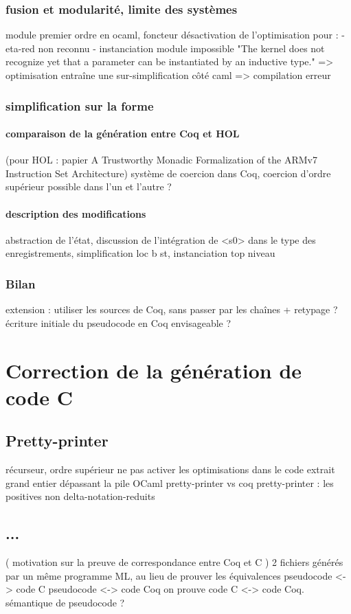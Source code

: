 \documentclass[a4paper, 11pt]{article}
\begin{document}
    \subsubsection{fusion et modularité, limite des systèmes}
    module premier ordre en ocaml, foncteur
    désactivation de l'optimisation pour :
      - eta-red non reconnu
      - instanciation module impossible "The kernel does not recognize yet that a parameter can be instantiated by an inductive type." => optimisation entraîne une sur-simplification côté caml => compilation erreur 
      
    \subsubsection{simplification sur la forme}
      \paragraph{comparaison de la génération entre Coq et HOL}
      (pour HOL : papier A Trustworthy Monadic Formalization of the
ARMv7 Instruction Set Architecture)
      système de coercion dans Coq, coercion d'ordre supérieur possible dans l'un et l'autre ?
      \paragraph{description des modifications}
      abstraction de l'état, 
      discussion de l'intégration de <s0> dans le type des enregistrements,
      simplification {loc b st}, instanciation top niveau
    \subsubsection{Bilan}
    extension : utiliser les sources de Coq, sans passer par les chaînes + retypage ?
    écriture initiale du pseudocode en Coq envisageable ?

\section{Correction de la génération de code C}
\subsection{Pretty-printer}
récurseur, ordre supérieur
ne pas activer les optimisations dans le code extrait
grand entier dépassant la pile OCaml
pretty-printer vs coq pretty-printer : les positives non delta-notation-reduits
\subsection{...}
  ( motivation sur la preuve de correspondance entre Coq et C )
  2 fichiers générés par un même programme ML, au lieu de prouver les équivalences 
  pseudocode <-> code C
  pseudocode <-> code Coq
  on prouve code C <-> code Coq. sémantique de pseudocode ?
\end{document}
